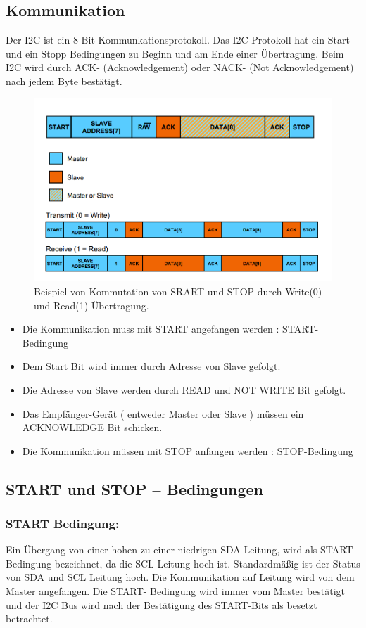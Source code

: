 \documentclass[conference]{IEEEtran}
\begin{document}
\subsection{Kommunikation}

Der I2C ist ein 8-Bit-Kommunkationsprotokoll. Das I2C-Protokoll hat ein Start und ein Stopp Bedingungen zu Beginn und am Ende einer Übertragung. Beim I2C wird durch ACK- (Acknowledgement) oder NACK- (Not Acknowledgement) nach jedem Byte bestätigt.


\begin{figure}
	\centering
	\includegraphics[width=0.7\linewidth]{fig14}
	\caption{Beispiel von Kommutation von SRART und STOP durch Write(0) und Read(1) Übertragung.}
	\label{fig:fig14}
\end{figure}



\begin{itemize}
\item Die Kommunikation muss mit START angefangen werden : START-Bedingung
\item	Dem Start Bit wird immer durch Adresse von Slave gefolgt. 
\item	Die Adresse von Slave werden durch READ und NOT WRITE Bit gefolgt. 
\item Das Empfänger-Gerät ( entweder Master oder Slave ) müssen ein ACKNOWLEDGE Bit schicken.  
\item	Die Kommunikation müssen mit STOP anfangen werden : STOP-Bedingung
	
\end{itemize}

\subsection{	START und STOP – Bedingungen}
\subsubsection{START Bedingung: }
Ein Übergang von einer hohen zu einer niedrigen SDA-Leitung, wird als START-Bedingung bezeichnet, da die SCL-Leitung hoch ist. Standardmäßig ist der Status von SDA und SCL Leitung hoch. Die Kommunikation auf Leitung wird von dem Master angefangen. Die START- Bedingung wird immer vom Master bestätigt und der I2C Bus wird nach der Bestätigung des START-Bits als besetzt betrachtet. 
\end{document}
